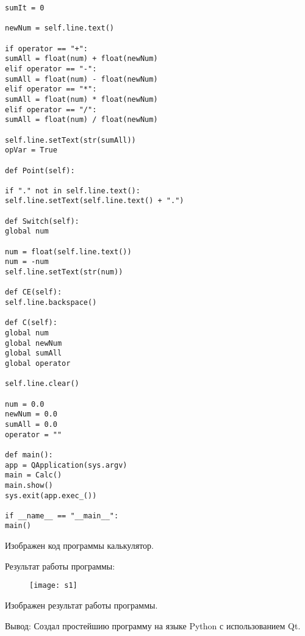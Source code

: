 \begin{verbatim}
sumIt = 0

newNum = self.line.text()

if operator == "+":
sumAll = float(num) + float(newNum)
elif operator == "-":
sumAll = float(num) - float(newNum)
elif operator == "*":
sumAll = float(num) * float(newNum)
elif operator == "/":
sumAll = float(num) / float(newNum)

self.line.setText(str(sumAll))
opVar = True

def Point(self):

if "." not in self.line.text():
self.line.setText(self.line.text() + ".")

def Switch(self):
global num

num = float(self.line.text())
num = -num
self.line.setText(str(num))

def CE(self):
self.line.backspace()

def C(self):
global num
global newNum
global sumAll
global operator

self.line.clear()

num = 0.0
newNum = 0.0
sumAll = 0.0
operator = ""

def main():
app = QApplication(sys.argv)
main = Calc()
main.show()
sys.exit(app.exec_())

if __name__ == "__main__":
main()
\end{verbatim}
Изображен код программы калькулятор.
\begin{center}
Результат работы программы:
\end{center}

\begin{figure}[h]
	\centering
	\texttt{[image: s1]}

	\label{fig:s1}
\end{figure}
Изображен результат работы программы.

Вывод: Создал простейшию программу на языке Python с использованием Qt.




